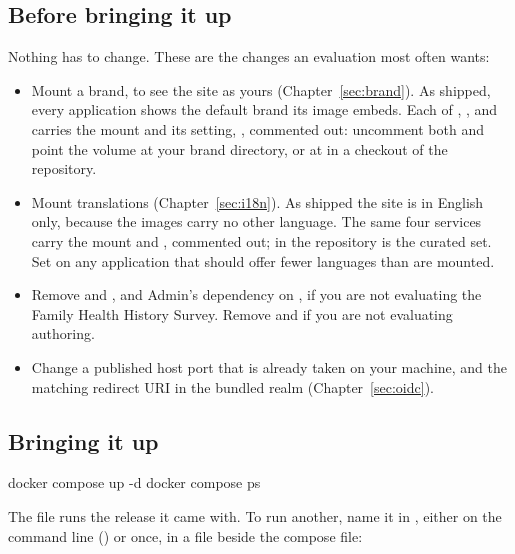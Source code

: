 \documentclass[11pt, a4paper]{article}
\begin{document}
\subsection{Before bringing it up}
\label{sec:compose-before}

Nothing has to change. These are the changes an evaluation most often wants:

\begin{itemize}
  \item Mount a brand, to see the site as yours (Chapter~\ref{sec:brand}). As shipped, every
        application shows the default brand its image embeds. Each of ,
        ,  and  carries the mount and its setting,
        , commented out: uncomment both and point the volume at
        your brand directory, or at  in a checkout of the repository.
  \item Mount translations (Chapter~\ref{sec:i18n}). As shipped the site is in English only,
        because the images carry no other language. The same four services carry the mount
        and , commented out;  in the repository
        is the curated set. Set  on any application that should
        offer fewer languages than are mounted.
  \item Remove  and , and Admin's dependency on , if you
        are not evaluating the Family Health History Survey. Remove  and
         if you are not evaluating authoring.
  \item Change a published host port that is already taken on your machine, and the matching
        redirect URI in the bundled realm (Chapter~\ref{sec:oidc}).
\end{itemize}

\subsection{Bringing it up}
\label{sec:compose-up}

\begin{elicitcmd}
docker compose up -d
docker compose ps
\end{elicitcmd}

The file runs the release it came with. To run another, name it in , either
on the command line () or once, in a
 file beside the compose file:
\end{document}
